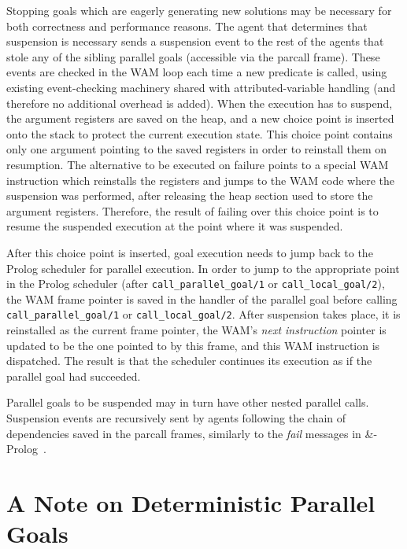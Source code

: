 \documentclass{tlp}
\newcommand{\compressection}{\vspace{-1em}}
\begin{document}
Stopping goals which are eagerly generating new solutions
may be necessary for both correctness and performance reasons.
The agent that determines that suspension is
necessary sends a suspension event to the rest of the agents that
stole any of the sibling parallel goals (accessible via the parcall
frame).  These events are checked in the WAM loop each time a new
predicate is called, using existing event-checking machinery shared
with attributed-variable handling (and therefore no additional
overhead is added).
When the execution has to suspend, the argument registers are saved on
the heap, and a new choice point is inserted onto the stack to protect
the current execution state.  This choice point contains only one
argument pointing to the saved registers in order to
reinstall them on resumption.  The alternative to be executed on
failure points to a special WAM instruction which reinstalls the
registers and jumps to the WAM code where the suspension was
performed, after releasing the heap section used to store the
argument registers.  Therefore, the result of failing over this choice
point is to resume the suspended execution at the point where it was
suspended.

After this choice point is inserted, goal execution needs to jump back
to the Prolog scheduler for parallel execution.
In order to jump to the appropriate point in the Prolog scheduler
(after \lstinline{call_parallel_goal/1} or
\lstinline{call_local_goal/2}), the WAM frame pointer is saved in the
handler of the parallel goal before calling
\lstinline{call_parallel_goal/1} or \lstinline{call_local_goal/2}.
After
suspension takes place, it is reinstalled as the current frame
pointer, the WAM's \emph{next instruction} pointer is updated to be
the one pointed to by this frame, and this WAM instruction is
dispatched.
The result is that the scheduler continues its execution as if the
parallel goal had succeeded.


Parallel goals to be suspended may in turn have other nested parallel
calls.  Suspension events are recursively sent by agents following the chain of
dependencies saved in the parcall frames, similarly to the \emph{fail}
messages in \&-Prolog~\cite{ngc-and-prolog}.







\compressection
\section{A Note on Deterministic Parallel Goals}
\label{sec:note-det-parallel-goals}
\end{document}
